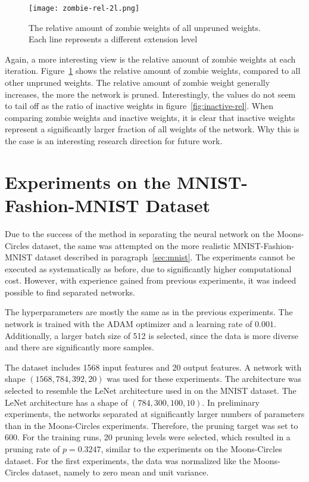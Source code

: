 \begin{figure}[ht]
    \centering
    \texttt{[image: zombie-rel-2l.png]}
    \caption{
        The relative amount of zombie weights of all unpruned weights. Each line represents a different extension level
    }\label{fig:zombie-rel}
\end{figure}
Again, a more interesting view is the relative amount of zombie weights at each iteration.
Figure~\ref{fig:zombie-rel} shows the relative amount of zombie weights, compared to all other unpruned weights.
The relative amount of zombie weight generally increases, the more the network is pruned.
Interestingly, the values do not seem to tail off as the ratio of inactive weights in figure~\ref{fig:inactive-rel}.
When comparing zombie weights and inactive weights, it is clear that inactive weights represent a significantly larger fraction of all weights of the network.
Why this is the case is an interesting research direction for future work.


\section{Experiments on the MNIST-Fashion-MNIST Dataset}
Due to the success of the method in separating the neural network on the Moons-Circles dataset, the same was attempted on the more realistic MNIST-Fashion-MNIST dataset described in paragraph~\ref{sec:mnist}.
The experiments cannot be executed as systematically as before, due to significantly higher computational cost.
However, with experience gained from previous experiments, it was indeed possible to find separated networks.

The hyperparameters are mostly the same as in the previous experiments.
The network is trained with the ADAM optimizer and a learning rate of $0.001$.
Additionally, a larger batch size of 512 is selected, since the data is more diverse and there are significantly more samples.

The dataset includes 1568 input features and 20 output features.
A network with shape $(1568, 784, 392, 20)$ was used for these experiments.
The architecture was selected to resemble the LeNet architecture used in \autocite{LTH} on the MNIST dataset.
The LeNet architecture has a shape of $(784, 300, 100, 10)$.
In preliminary experiments, the networks separated at significantly larger numbers of parameters than in the Moons-Circles experiments.
Therefore, the pruning target was set to 600.
For the training runs, 20 pruning levels were selected, which resulted in a pruning rate of $p=0.3247$, similar to the experiments on the Moons-Circles dataset.
For the first experiments, the data was normalized like the Moons-Circles dataset, namely to zero mean and unit variance.

